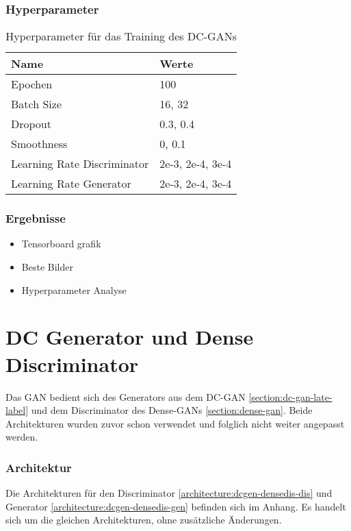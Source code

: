 \subsubsection{Hyperparameter}
\begin{table}[H]
	\centering
	\begin{tabular}{l l}
		Name                        & Werte            \\ \hline
		Epochen                     & 100              \\
		Batch Size                  & 16, 32           \\
		Dropout                     & 0.3, 0.4         \\
		Smoothness                  & 0, 0.1           \\
		Learning Rate Discriminator & 2e-3, 2e-4, 3e-4 \\
		Learning Rate Generator     & 2e-3, 2e-4, 3e-4
	\end{tabular}
	\caption{Hyperparameter für das Training des DC-GANs}
\end{table}

\subsubsection{Ergebnisse}
\begin{itemize}
	\item Tensorboard grafik
	\item Beste Bilder
	\item Hyperparameter Analyse
\end{itemize}

\section{DC Generator und Dense Discriminator}
Das GAN bedient sich des Generators aus dem DC-GAN \cref{section:dc-gan-late-label} und dem Discriminator des Dense-GANs \cref{section:dense-gan}.
Beide Architekturen wurden zuvor schon verwendet und folglich nicht weiter angepasst werden.

\subsubsection{Architektur}
Die Architekturen für den Discriminator \cref{architecture:dcgen-densedis-dis} und Generator \cref{architecture:dcgen-densedis-gen} befinden sich im Anhang.
Es handelt sich um die gleichen Architekturen, ohne zusätzliche Änderungen.

